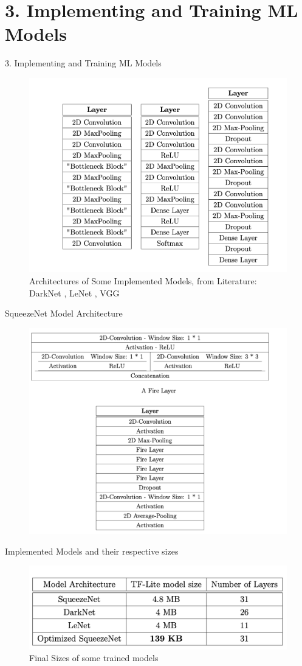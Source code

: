 \documentclass{beamer}
\begin{document}
\section{3. Implementing and Training ML Models} 
\begin{frame}{3. Implementing and Training ML Models}
        \begin{figure}
        \centering
        \includegraphics[width = 8 cm]{images/other_models.png}
        \caption{Architectures of Some Implemented Models, from Literature: DarkNet \cite{tiny_darknet}, LeNet \cite{lenet_paper}, VGG \cite{vgg_paper}} 
        \label{fig:model_sizes_trained}
    \end{figure}
\end{frame}
\begin{frame}{SqueezeNet Model Architecture}
        \begin{figure}
        \centering
        \includegraphics[width = 8 cm]{images/squeezenet_arch.png}
        \label{fig:model_sizes_trained}
    \end{figure}
\end{frame}
\begin{frame}{Implemented Models and their respective sizes}
    \begin{figure}
        \centering
        \includegraphics[width = 8 cm]{images/models_sizes.png}
        \caption{Final Sizes of some trained models}
        \label{fig:model_sizes_trained}
    \end{figure}
\end{frame}
\end{document}

